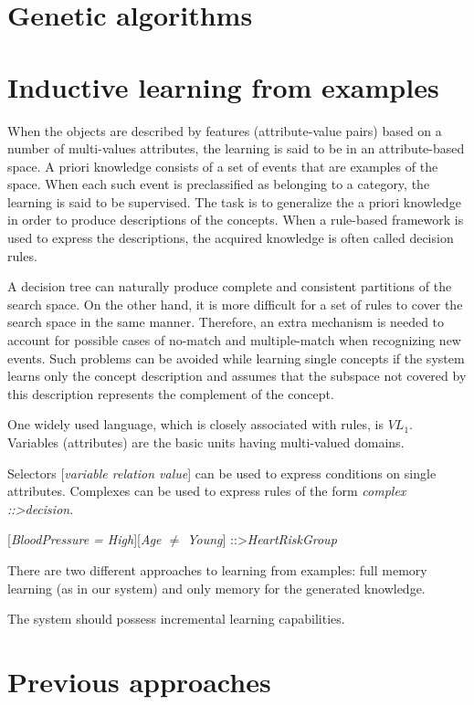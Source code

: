 \documentclass[12pt]{book}
\begin{document}
\section{Genetic algorithms}

\section{Inductive learning from examples}
When the objects are described by features (attribute-value pairs) based on a number of multi-values attributes, the learning is said to be in an attribute-based space. A priori knowledge consists of a set of events that are examples of the space. When each such event is preclassified as belonging to a category, the learning is said to be supervised. The task is to generalize the a priori knowledge in order to produce descriptions of the concepts. When a rule-based framework is used to express the descriptions, the acquired knowledge is often called decision rules.

A decision tree can naturally produce complete and consistent partitions of the search space. On the other hand, it is more difficult for a set of rules to cover the search space in the same manner. Therefore, an extra mechanism is needed to account for possible cases of no-match and multiple-match when recognizing new events. Such problems can be avoided while learning single concepts if the system learns only the concept description and assumes that the subspace not covered by this description represents the complement of the concept.

One widely used language, which is closely associated with rules, is $VL_1$. Variables (attributes) are the basic units having multi-valued domains.

Selectors [\textit{variable relation value}] can be used to express conditions on single attributes. Complexes can be used to express rules of the form \textit{complex ::\textgreater decision}.
\begin{center}
[\textit{BloodPressure = High}][\textit{Age $\ne$ Young}] ::\textgreater \textit{HeartRiskGroup}
\end{center}

There are two different approaches to learning from examples: full memory learning (as in our system) and only memory for the generated knowledge.

The system should possess incremental learning capabilities.

\section{Previous approaches}
\end{document}
